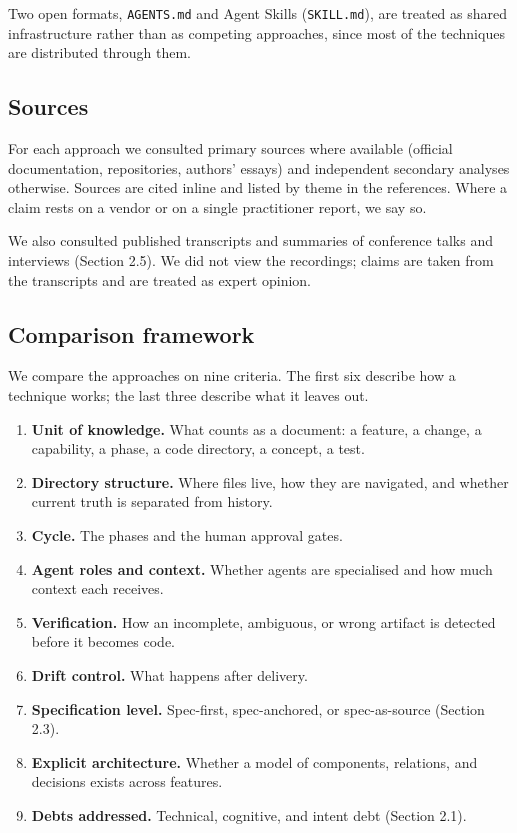 \documentclass[11pt]{article}
\begin{document}
Two open formats, \texttt{AGENTS.md} and Agent Skills (\texttt{SKILL.md}), are treated as shared infrastructure rather than as competing approaches, since most of the techniques are distributed through them.

\subsection{Sources}

For each approach we consulted primary sources where available (official documentation, repositories, authors' essays) and independent secondary analyses otherwise. Sources are cited inline and listed by theme in the references. Where a claim rests on a vendor or on a single practitioner report, we say so.

We also consulted published transcripts and summaries of conference talks and interviews (Section 2.5). We did not view the recordings; claims are taken from the transcripts and are treated as expert opinion.

\subsection{Comparison framework}

We compare the approaches on nine criteria. The first six describe how a technique works; the last three describe what it leaves out.

\begin{enumerate}[leftmargin=*]
  \item \textbf{Unit of knowledge.} What counts as a document: a feature, a change, a capability, a phase, a code directory, a concept, a test.
  \item \textbf{Directory structure.} Where files live, how they are navigated, and whether current truth is separated from history.
  \item \textbf{Cycle.} The phases and the human approval gates.
  \item \textbf{Agent roles and context.} Whether agents are specialised and how much context each receives.
  \item \textbf{Verification.} How an incomplete, ambiguous, or wrong artifact is detected before it becomes code.
  \item \textbf{Drift control.} What happens after delivery.
  \item \textbf{Specification level.} Spec-first, spec-anchored, or spec-as-source (Section 2.3).
  \item \textbf{Explicit architecture.} Whether a model of components, relations, and decisions exists across features.
  \item \textbf{Debts addressed.} Technical, cognitive, and intent debt (Section 2.1).
\end{enumerate}
\end{document}
